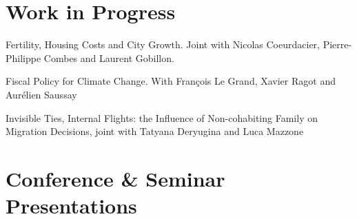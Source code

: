 \documentclass[letterpaper]{article}
\renewenvironment{itemize}{
  \begin{list}{}{
    \setlength{\leftmargin}{1.5em}
  }
}{
  \end{list}
}
\begin{document}
\section*{Work in Progress}

\begin{itemize}
\item Fertility, Housing Costs and City Growth. Joint with Nicolas Coeurdacier, Pierre-Philippe Combes and Laurent Gobillon.
\item Fiscal Policy for Climate Change. With François Le Grand, Xavier Ragot and Aurélien Saussay
\item Invisible Ties, Internal Flights: the Influence of Non-cohabiting Family on Migration Decisions, joint with Tatyana Deryugina and Luca Mazzone
\end{itemize}

\section*{Conference \& Seminar Presentations}
\end{document}
